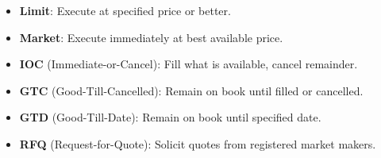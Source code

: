 \begin{itemize}[nosep]
  \item \textbf{Limit}: Execute at specified price or better.
  \item \textbf{Market}: Execute immediately at best available price.
  \item \textbf{IOC} (Immediate-or-Cancel): Fill what is available, cancel remainder.
  \item \textbf{GTC} (Good-Till-Cancelled): Remain on book until filled or cancelled.
  \item \textbf{GTD} (Good-Till-Date): Remain on book until specified date.
  \item \textbf{RFQ} (Request-for-Quote): Solicit quotes from registered market makers.
\end{itemize}

